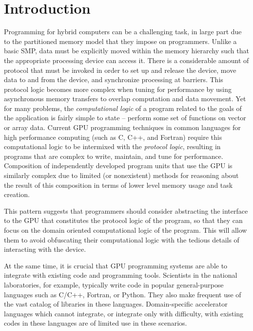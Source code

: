 
\section{Introduction}

Programming for hybrid computers can be a challenging task, in large
part due to the partitioned memory model that they impose on
programmers. Unlike a basic SMP, data must be explicitly moved within
the memory hierarchy such that the appropriate processing device can
access it. There is a considerable amount of protocol that must be
invoked in order to set up and release the device, move data to and
from the device, and synchronize processing at barriers. This protocol
logic becomes more complex when tuning for performance by using
asynchronous memory transfers to overlap computation and data
movement. Yet for many problems, the \emph{computational logic} of a
program related to the goals of the application is fairly simple to
state -- perform some set of functions on vector or array
data. Current GPU programming techniques in common languages for high
performance computing (such as C, C++, and Fortran) require this
computational logic to be intermixed with the \emph{protocol logic},
resulting in programs that are complex to write, maintain, and tune
for performance.  Composition of independently developed program units
that use the GPU is similarly complex due to limited (or nonexistent)
methods for reasoning about the result of this composition in terms of
lower level memory usage and task creation.

This pattern suggests that programmers should consider abstracting the interface
to the GPU that constitutes the protocol logic of the program, so that they can
focus on the domain oriented computational logic of the program. This will allow
them to avoid obfuscating their computational logic with the tedious details of
interacting with the device.

At the same time, it is crucial that GPU programming systems are able
to integrate with existing code and programming tools. Scientists in
the national laboratories, for example, typically write code in
popular general-purpose languages such as C/C++, Fortran, or
Python. They also make frequent use of the vast catalog of libraries
in these languages. Domain-specific accelerator languages which cannot
integrate, or integrate only with difficulty, with existing codes in
these languages are of limited use in these scenarios.

